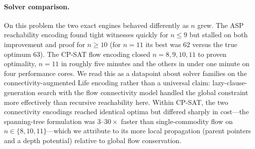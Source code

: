 \documentclass{article}
\begin{document}
\paragraph{Solver comparison.} On this problem the two exact engines behaved differently as $n$ grew. The ASP reachability encoding found tight witnesses quickly for $n\le 9$ but stalled on both improvement and proof for $n\ge 10$ (for $n=11$ its best was $62$ versus the true optimum $63$). The CP-SAT flow encoding closed $n=8,9,10,11$ to proven optimality, $n=11$ in roughly five minutes and the others in under one minute on four performance cores. We read this as a datapoint about solver families on the connectivity-augmented Life encoding rather than a universal claim: lazy-clause-generation search with the flow connectivity model handled the global constraint more effectively than recursive reachability here. Within CP-SAT, the two connectivity encodings reached identical optima but differed sharply in cost---the spanning-tree formulation was $3$--$30\times$ faster than single-commodity flow on $n\in\{8,10,11\}$---which we attribute to its more local propagation (parent pointers and a depth potential) relative to global flow conservation.
\end{document}
